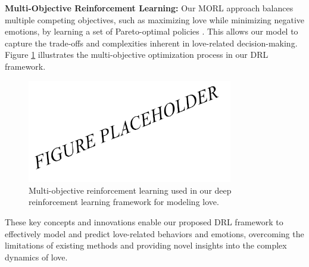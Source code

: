\textbf{Multi-Objective Reinforcement Learning:} Our MORL approach balances multiple competing objectives, such as maximizing love while minimizing negative emotions, by learning a set of Pareto-optimal policies \citep{roijers2013survey}. This allows our model to capture the trade-offs and complexities inherent in love-related decision-making. Figure \ref{fig:morl} illustrates the multi-objective optimization process in our DRL framework.

\begin{figure}[h]
    \centering
    \includegraphics[width=0.8\textwidth]{fig4.png}
    \caption{Multi-objective reinforcement learning used in our deep reinforcement learning framework for modeling love.}
    \label{fig:morl}
\end{figure}

These key concepts and innovations enable our proposed DRL framework to effectively model and predict love-related behaviors and emotions, overcoming the limitations of existing methods and providing novel insights into the complex dynamics of love.
